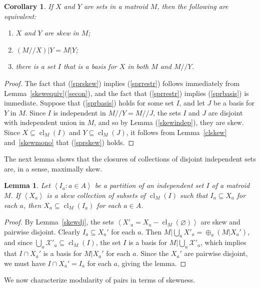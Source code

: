 \documentclass{amsart}
\theoremstyle{plain}
\newtheorem{lemma}[theorem]{Lemma}
\newtheorem{corollary}[theorem]{Corollary}
\theoremstyle{definition}
\newcommand{\cX}{\mathcal{X}}
\newcommand{\dcon}{/ \!\! /}
\DeclareMathOperator{\cl}{cl}
\newcommand{\ab}[1]{\left\langle#1\right\rangle}
\newcommand{\es}{\varnothing}
\renewcommand{\ss}{\subseteq}
\begin{document}
\begin{corollary}\label{skewpairrestrict}
  If $X$ and $Y$ are sets in a matroid $M$, then the following are equivalent: 
  \begin{enumerate}[(1)]
    \item\label{sprskew} $X$ and $Y$ are skew in $M$;
    \item\label{sprrestr} $(M \dcon X) | Y = M | Y$; 
    \item\label{sprbasis} there is a set $I$ that is a basis for $X$ in both $M$ and $M \dcon Y$. 
  \end{enumerate}
\end{corollary}
\begin{proof}
  The fact that (\ref{sprskew}) implies (\ref{sprrestr}) follows immediately from 
  Lemma~\ref{skewequiv}(\ref{secon}), 
  and the fact that (\ref{sprrestr}) implies (\ref{sprbasis}) is immediate. 
  Suppose that (\ref{sprbasis}) holds for some set $I$, and let $J$ be a basis for $Y$ in $M$. 
  Since $I$ is independent in $M \dcon Y = M \dcon J$, the sets $I$ and $J$ are disjoint
  with independent union in $M$, and so by Lemma (\ref{skewindep}), they are skew. 
  Since $X \ss \cl_M(I)$ and $Y \ss \cl_M(J)$, it follows from Lemma~\ref{clskew} and~\ref{skewmono}
  that (\ref{sprskew}) holds. 
\end{proof}

The next lemma shows that the closures of collections of disjoint independent sets
are, in a sense, maximally skew. 

\begin{lemma}\label{maxskew}
  Let $\ab{I_a : a \in A}$ be a partition of an independent set $I$ of a matroid $M$. 
  If $\ab{X_a}$ is a skew collection of subsets of $\cl_M(I)$ such that $I_a \ss X_a$ for each $a$, 
  then $X_a \ss \cl_M(I_a)$ for each $a \in A$. 
\end{lemma}
\begin{proof}
  By Lemma~\ref{skewdj}, the sets $\ab{X'_a = X_a - \cl_M(\es)}$ are skew and pairwise disjoint. Clearly $I_a \ss X_a'$ for each $a$. 
  Then $M | \bigcup_a X'_a = \oplus_a (M | X_a')$, and since $\bigcup_a \cX'_a \ss \cl_M(I)$, the set $I$ 
  is a basis for $M | \bigcup_a \cX'_a$, which implies that $I \cap X_a'$ is a basis for $M | X_a'$ for each $a$. 
  Since the $X_a'$ are pairwise disjoint, we must have $I \cap X_a' = I_a$ for each $a$, giving the lemma. 
\end{proof}


We now characterize modularity of pairs in terms of skewness. 
\end{document}
